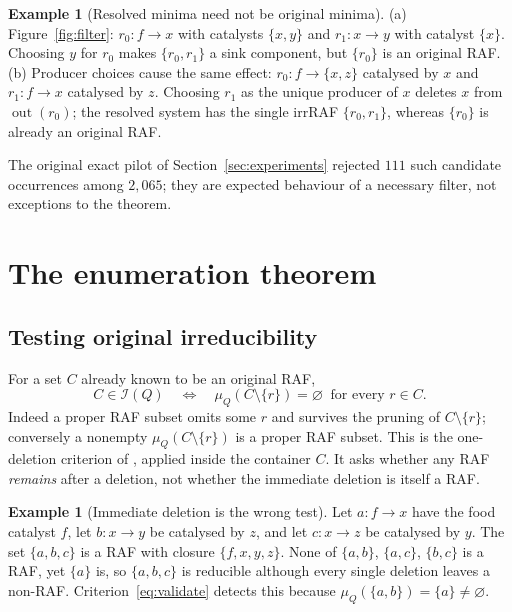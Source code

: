 \documentclass[11pt,a4paper]{article}
\theoremstyle{plain}
\theoremstyle{definition}
\newtheorem{example}[theorem]{Example}
\theoremstyle{remark}
\newcommand{\Irr}{\mathcal I}
\newcommand{\muQ}{\mu_Q}
\newcommand{\out}{\operatorname{out}}
\begin{document}
\begin{example}[Resolved minima need not be original minima]\label{ex:filter}
(a) Figure~\ref{fig:filter}: $r_0\colon f\to x$ with catalysts $\{x,y\}$ and $r_1\colon x\to y$ with catalyst $\{x\}$. Choosing $y$ for $r_0$ makes $\{r_0,r_1\}$ a sink component, but $\{r_0\}$ is an original RAF.
(b) Producer choices cause the same effect: $r_0\colon f\to\{x,z\}$ catalysed by $x$ and $r_1\colon f\to x$ catalysed by $z$. Choosing $r_1$ as the unique producer of $x$ deletes $x$ from $\out(r_0)$; the resolved system has the single irrRAF $\{r_0,r_1\}$, whereas $\{r_0\}$ is already an original RAF.
\end{example}

The original exact pilot of Section~\ref{sec:experiments} rejected $111$ such candidate occurrences among $2{,}065$; they are expected behaviour of a necessary filter, not exceptions to the theorem.

\section{The enumeration theorem}\label{sec:enumeration}

\subsection{Testing original irreducibility}

For a set $C$ already known to be an original RAF,
\begin{equation}\label{eq:validate}
 C\in\Irr(Q)\quad\Longleftrightarrow\quad \muQ(C\setminus\{r\})=\varnothing\ \text{ for every } r\in C .
\end{equation}
Indeed a proper RAF subset omits some $r$ and survives the pruning of $C\setminus\{r\}$; conversely a nonempty $\muQ(C\setminus\{r\})$ is a proper RAF subset. This is the one-deletion criterion of \cite{steel2013minimal}, applied inside the container $C$. It asks whether any RAF \emph{remains} after a deletion, not whether the immediate deletion is itself a RAF.

\begin{example}[Immediate deletion is the wrong test]\label{ex:immediate}
Let $a\colon f\to x$ have the food catalyst $f$, let $b\colon x\to y$ be catalysed by $z$, and let $c\colon x\to z$ be catalysed by $y$. The set $\{a,b,c\}$ is a RAF with closure $\{f,x,y,z\}$. None of $\{a,b\}$, $\{a,c\}$, $\{b,c\}$ is a RAF, yet $\{a\}$ is, so $\{a,b,c\}$ is reducible although every single deletion leaves a non-RAF. Criterion~\eqref{eq:validate} detects this because $\muQ(\{a,b\})=\{a\}\ne\varnothing$.
\end{example}
\end{document}
